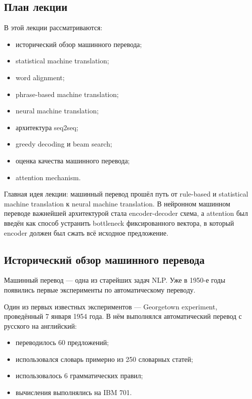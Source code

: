 \documentclass[a4paper,12pt]{article}
\begin{document}
\subsection{План лекции}

В этой лекции рассматриваются:

\begin{itemize}
    \item исторический обзор машинного перевода;
    \item statistical machine translation;
    \item word alignment;
    \item phrase-based machine translation;
    \item neural machine translation;
    \item архитектура seq2seq;
    \item greedy decoding и beam search;
    \item оценка качества машинного перевода;
    \item attention mechanism.
\end{itemize}

Главная идея лекции: машинный перевод прошёл путь от rule-based и statistical machine translation к neural machine translation. В нейронном машинном переводе важнейшей архитектурой стала encoder-decoder схема, а attention был введён как способ устранить bottleneck фиксированного вектора, в который encoder должен был сжать всё исходное предложение.

\subsection{Исторический обзор машинного перевода}

Машинный перевод --- одна из старейших задач NLP. Уже в 1950-е годы появились первые эксперименты по автоматическому переводу.

Один из первых известных экспериментов --- Georgetown experiment, проведённый 7 января 1954 года. В нём выполнялся автоматический перевод с русского на английский:

\begin{itemize}
    \item переводилось 60 предложений;
    \item использовался словарь примерно из 250 словарных статей;
    \item использовалось 6 грамматических правил;
    \item вычисления выполнялись на IBM 701.
\end{itemize}
\end{document}

